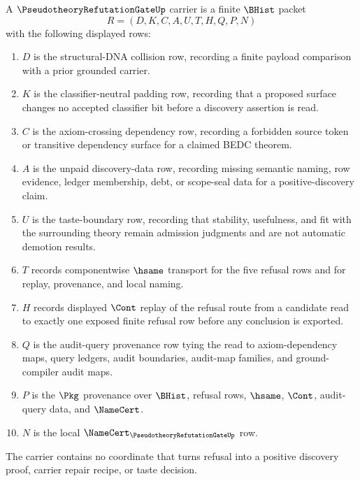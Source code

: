 \begin{definition}
\label{def:pseudotheory-refutation-gate-carrier}
A $\PseudotheoryRefutationGateUp$ carrier is a finite $\BHist$ packet
$$
R=(D,K,C,A,U,T,H,Q,P,N)
$$
with the following displayed rows:
\begin{enumerate}
\item $D$ is the structural-DNA collision row, recording a finite payload comparison with a prior grounded carrier.
\item $K$ is the classifier-neutral padding row, recording that a proposed surface changes no accepted classifier bit before a discovery assertion is read.
\item $C$ is the axiom-crossing dependency row, recording a forbidden source token or transitive dependency surface for a claimed BEDC theorem.
\item $A$ is the unpaid discovery-data row, recording missing semantic naming, row evidence, ledger membership, debt, or scope-seal data for a positive-discovery claim.
\item $U$ is the taste-boundary row, recording that stability, usefulness, and fit with the surrounding theory remain admission judgments and are not automatic demotion results.
\item $T$ records componentwise $\hsame$ transport for the five refusal rows and for replay, provenance, and local naming.
\item $H$ records displayed $\Cont$ replay of the refusal route from a candidate read to exactly one exposed finite refusal row before any conclusion is exported.
\item $Q$ is the audit-query provenance row tying the read to axiom-dependency maps, query ledgers, audit boundaries, audit-map families, and ground-compiler audit maps.
\item $P$ is the $\Pkg$ provenance over $\BHist$, refusal rows, $\hsame$, $\Cont$, audit-query data, and $\NameCert$.
\item $N$ is the local $\NameCert_{\PseudotheoryRefutationGateUp}$ row.
\end{enumerate}
The carrier contains no coordinate that turns refusal into a positive discovery proof, carrier repair recipe, or taste decision.
\end{definition}


